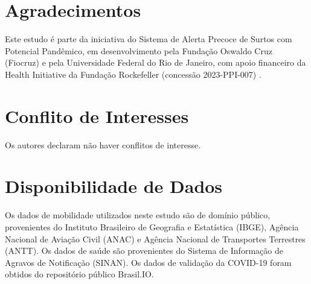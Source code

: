 \documentclass[preprint,12pt]{elsarticle}
\begin{document}
\section*{Agradecimentos}
Este estudo é parte da iniciativa do Sistema de Alerta Precoce de Surtos com Potencial Pandêmico, em desenvolvimento pela Fundação Oswaldo Cruz (Fiocruz) e pela Universidade Federal do Rio de Janeiro, com apoio financeiro da Health Initiative da Fundação Rockefeller (concessão 2023-PPI-007) \cite{oliveira2024acknowledgments}.

\section*{Conflito de Interesses}
Os autores declaram não haver conflitos de interesse.

\section*{Disponibilidade de Dados}
Os dados de mobilidade utilizados neste estudo são de domínio público, provenientes do Instituto Brasileiro de Geografia e Estatística (IBGE), Agência Nacional de Aviação Civil (ANAC) e Agência Nacional de Transportes Terrestres (ANTT). Os dados de saúde são provenientes do Sistema de Informação de Agravos de Notificação (SINAN). Os dados de validação da COVID-19 foram obtidos do repositório público Brasil.IO.



\end{document}
